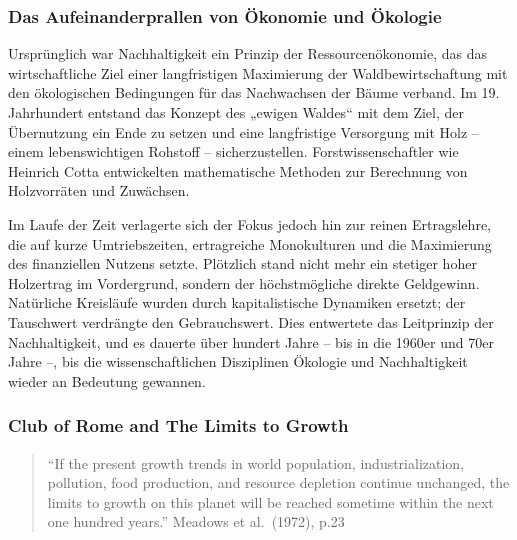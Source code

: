 \documentclass[
  letterpaper,
  DIV=11,
  numbers=noendperiod]{scrartcl}
\begin{document}
\subsubsection{Das Aufeinanderprallen von Ökonomie und
Ökologie}\label{das-aufeinanderprallen-von-uxf6konomie-und-uxf6kologie}

Ursprünglich war Nachhaltigkeit ein Prinzip der Ressourcenökonomie, das
das wirtschaftliche Ziel einer langfristigen Maximierung der
Waldbewirtschaftung mit den ökologischen Bedingungen für das Nachwachsen
der Bäume verband. Im 19. Jahrhundert entstand das Konzept des „ewigen
Waldes`` mit dem Ziel, der Übernutzung ein Ende zu setzen und eine
langfristige Versorgung mit Holz -- einem lebenswichtigen Rohstoff --
sicherzustellen. Forstwissenschaftler wie Heinrich Cotta entwickelten
mathematische Methoden zur Berechnung von Holzvorräten und Zuwächsen.

Im Laufe der Zeit verlagerte sich der Fokus jedoch hin zur reinen
Ertragslehre, die auf kurze Umtriebszeiten, ertragreiche Monokulturen
und die Maximierung des finanziellen Nutzens setzte. Plötzlich stand
nicht mehr ein stetiger hoher Holzertrag im Vordergrund, sondern der
höchstmögliche direkte Geldgewinn. Natürliche Kreisläufe wurden durch
kapitalistische Dynamiken ersetzt; der Tauschwert verdrängte den
Gebrauchswert. Dies entwertete das Leitprinzip der Nachhaltigkeit, und
es dauerte über hundert Jahre -- bis in die 1960er und 70er Jahre --,
bis die wissenschaftlichen Disziplinen Ökologie und Nachhaltigkeit
wieder an Bedeutung gewannen.

\subsubsection{Club of Rome and The Limits to
Growth}\label{club-of-rome-and-the-limits-to-growth}

\begin{quote}
``If the present growth trends in world population, industrialization,
pollution, food production, and resource depletion continue unchanged,
the limits to growth on this planet will be reached sometime within the
next one hundred years.'' Meadows et al.~(1972), p.23
\end{quote}
\end{document}
